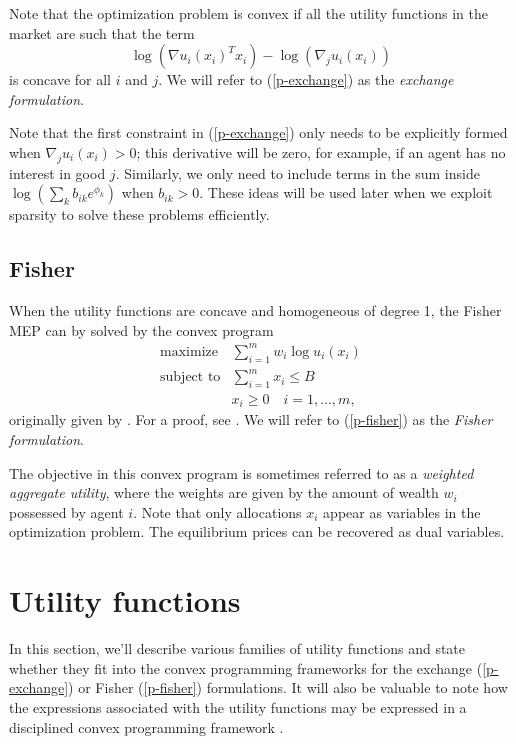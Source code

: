 \documentclass[12pt]{article}
\begin{document}
Note that the optimization problem is convex if all the utility functions
in the market are such that the term
\begin{equation}
\label{e-util-constraint}
\log(\nabla u_i(x_i)^T x_i) - \log(\nabla_j u_i(x_i))
\end{equation}
is concave for all $i$ and $j$.
We will refer to (\ref{p-exchange}) as the \emph{exchange formulation}.

Note that the first constraint in (\ref{p-exchange}) only needs to be explicitly formed when
$\nabla_j u_i(x_i) > 0$; this derivative will be zero, for example, if an agent has no interest in good $j$. Similarly, we only need to include terms in the sum inside
$\log(\sum_k b_{ik} e^{\phi_k})$ when $b_{ik} > 0$.
These ideas will be used later when we exploit sparsity to solve these
problems efficiently.

\subsection{Fisher}
\label{sec:convex_form_fisher}

When the utility functions are concave and homogeneous of degree 1,
the Fisher MEP can by solved by the convex program
\begin{equation}
\label{p-fisher}
\begin{array}{ll}
\mbox{maximize} & \sum_{i=1}^m w_i \log u_i(x_i) \\
\mbox{subject to} & \sum_{i=1}^m x_i \leq B\\
& x_i \geq 0\quad i=1,\ldots,m,
\end{array}
\end{equation}
originally given by \cite{eisenberg1959consensus, gale1960theory, eisenberg1961aggregation}.
For a proof, see \cite[\S6.2]{nisan2007algorithmic}. We will refer to (\ref{p-fisher}) as the \emph{Fisher formulation}.

The objective in this convex program is sometimes referred to as a \emph{weighted aggregate utility}, where the weights are given by the amount
of wealth $w_i$ possessed by agent $i$.
Note that only allocations $x_i$ appear as variables in the optimization
problem.
The equilibrium prices can be recovered as dual variables.

\section{Utility functions}
\label{sec:util_funcs}

In this section, we'll describe various families of utility functions
and state whether they fit into the convex programming frameworks
for the exchange (\ref{p-exchange}) or Fisher (\ref{p-fisher}) formulations.
It will also
be valuable to note how the expressions associated
with the utility functions may be expressed in a disciplined
convex programming framework \cite{GBY:06,Grant2004,cvx,cvxpy}.
\end{document}
